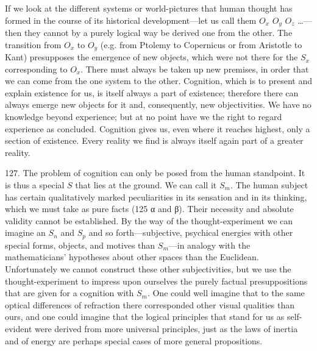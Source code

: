 \documentclass[12pt,a4paper]{book}
\newcommand{\opage}[1]{\marginnote{\footnotesize\textit{[#1]}}}
\begin{document}
\opage{303}If we look at the different systems or world-pictures that human thought has formed in the
course of its historical development---let us call them $O_x$ $O_y$ $O_z$ \ldots---then they
cannot by a purely logical way be derived one from the other. The transition from $O_x$ to
$O_y$ (e.g. from Ptolemy to Copernicus or from Aristotle to Kant) presupposes the emergence
of new objects, which were not there for the $S_x$ corresponding to $O_x$. There must always
be taken up new premises, in order that we can come from the one system to the other.
Cognition, which is to present and explain existence for us, is itself always a part of
existence; therefore there can always emerge new objects for it and, consequently, new
objectivities. We have no knowledge beyond experience; but at no point have we the right to
regard experience as concluded. Cognition gives us, even where it reaches highest, only a
section of existence. Every reality we find is always itself again part of a greater reality.

127. The problem of cognition can only be posed from the human standpoint. It is thus a
special $S$ that lies at the ground. We can call it $S_m$. The human subject has certain
qualitatively marked peculiarities in its sensation and in its thinking, which we must take
as pure facts (125 α and β). Their necessity and absolute validity cannot be established. By
the way of the thought-experiment we can imagine an $S_n$ and $S_p$ and so forth---subjective,
psychical energies with other special forms, objects, and motives than $S_m$---in analogy
with the mathematicians' hypotheses about other spaces than the Euclidean. Unfortunately we
cannot construct these other subjectivities, but we use the thought-experiment to impress
upon ourselves the purely factual presuppositions that are given for a cognition with $S_m$.
One could well imagine that to the same optical differences of refraction there
corresponded other visual qualities than ours, and one could imagine that the logical
principles that stand for us as self-evident were derived from more universal principles,
just as the laws of inertia and of energy are perhaps special cases of more general
propositions.
\end{document}
